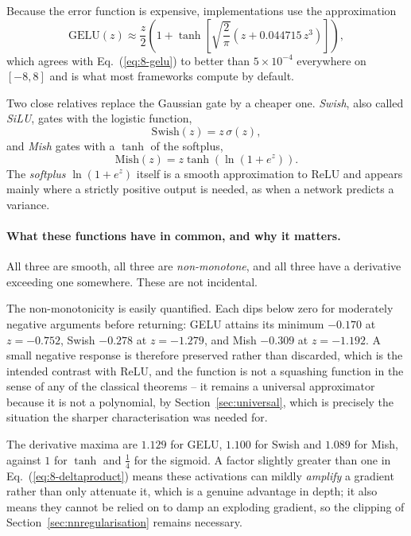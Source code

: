 Because the error function is expensive, implementations use the
approximation
\begin{equation}
  \mathrm{GELU}(z) \approx \frac{z}{2}
    \left(1+\tanh\left[\sqrt{\frac{2}{\pi}}
      \left(z+0.044715\,z^{3}\right)\right]\right),
  \label{eq:8-geluapprox}
\end{equation}
which agrees with Eq.~(\ref{eq:8-gelu}) to better than $5\times10^{-4}$
everywhere on $[-8,8]$ and is what most frameworks compute by default.

Two close relatives replace the Gaussian gate by a cheaper one.  \emph{Swish},
also called \emph{SiLU}, gates with the logistic function,
\begin{equation}
  \mathrm{Swish}(z) = z\,\sigma(z),
  \label{eq:8-swish}
\end{equation}
and \emph{Mish} gates with a $\tanh$ of the softplus,
\begin{equation}
  \mathrm{Mish}(z) = z\tanh\left(\ln\left(1+e^{z}\right)\right).
  \label{eq:8-mish}
\end{equation}
The \emph{softplus} $\ln(1+e^{z})$ itself is a smooth approximation to ReLU and
appears mainly where a strictly positive output is needed, as when a network
predicts a variance.

\paragraph{What these functions have in common, and why it matters.}
All three are smooth, all three are \emph{non-monotone}, and all three have a
derivative exceeding one somewhere.  These are not incidental.

The non-monotonicity is easily quantified.  Each dips below zero for moderately
negative arguments before returning: GELU attains its minimum $-0.170$ at
$z=-0.752$, Swish $-0.278$ at $z=-1.279$, and Mish $-0.309$ at $z=-1.192$.  A
small negative response is therefore preserved rather than discarded, which is
the intended contrast with ReLU, and the function is not a squashing function
in the sense of any of the classical theorems -- it remains a universal
approximator because it is not a polynomial, by Section~\ref{sec:universal},
which is precisely the situation the sharper characterisation was needed for.

The derivative maxima are $1.129$ for GELU, $1.100$ for Swish and $1.089$ for
Mish, against $1$ for $\tanh$ and $\tfrac14$ for the sigmoid.  A factor
slightly greater than one in Eq.~(\ref{eq:8-deltaproduct}) means these
activations can mildly \emph{amplify} a gradient rather than only attenuate it,
which is a genuine advantage in depth; it also means they cannot be relied on
to damp an exploding gradient, so the clipping of
Section~\ref{sec:nnregularisation} remains necessary.

